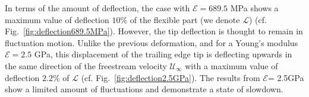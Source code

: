 \documentclass[conf]{new-aiaa}
\begin{document}
In terms of the amount of deflection, the case with $\mathcal{E}=689.5$ MPa shows a maximum value of deflection $10\%$ of the flexible part (we denote $\mathcal{L}$) (cf. Fig.~\ref{fig:deflection689.5MPa}).
%
However, the tip deflection is thought to remain in fluctuation motion.
%
Unlike the previous deformation, and for a Young's modulus $\mathcal{E}=2.5$ GPa, this displacement of the trailing edge tip is deflecting upwards in the same direction of the freestream velocity $\mathcal{U}_\infty$ with a maximum value of deflection $2.2\%$ of $\mathcal{L}$ (cf. Fig.~\ref{fig:deflection2.5GPa}).
%
The results from $\mathcal{E}$= 2.5GPa show a limited amount of fluctuations and demonstrate a state of slowdown. 



\end{document}
